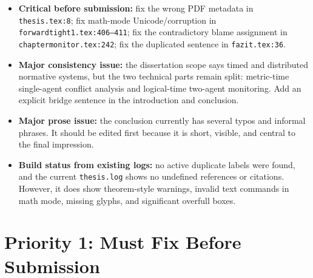 \documentclass[11pt,a4paper]{article}
\newcommand{\sev}[1]{\textbf{#1}}
\newcommand{\loc}[1]{\texttt{#1}}
\begin{document}
\begin{itemize}
  \item \sev{Critical before submission:} fix the wrong PDF metadata in
  \loc{thesis.tex:8}; fix math-mode Unicode/corruption in
  \loc{forwardtight1.tex:406--411}; fix the contradictory blame assignment in
  \loc{chaptermonitor.tex:242}; fix the duplicated sentence in \loc{fazit.tex:36}.
  \item \sev{Major consistency issue:} the dissertation scope says timed and
  distributed normative systems, but the two technical parts remain split:
  metric-time single-agent conflict analysis and logical-time two-agent monitoring.
  Add an explicit bridge sentence in the introduction and conclusion.
  \item \sev{Major prose issue:} the conclusion currently has several typos and
  informal phrases. It should be edited first because it is short, visible, and
  central to the final impression.
  \item \sev{Build status from existing logs:} no active duplicate labels were found,
  and the current \loc{thesis.log} shows no undefined references or citations.
  However, it does show theorem-style warnings, invalid text commands in math mode,
  missing glyphs, and significant overfull boxes.
\end{itemize}

\section*{Priority 1: Must Fix Before Submission}
\end{document}
